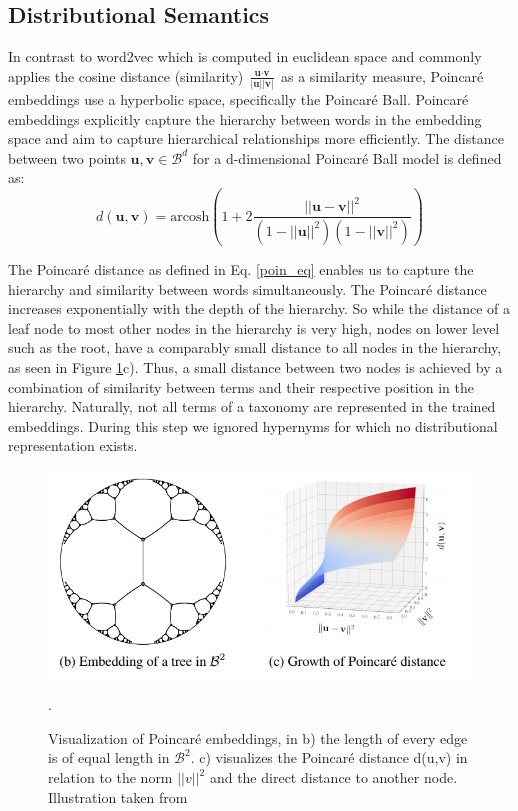 \documentclass[12pt, headsepline, a4paper]{scrartcl}
\begin{document}
\subsection{Distributional Semantics}
\label{dist_semantics}

In contrast to word2vec which is computed  in euclidean space and commonly applies the cosine distance (similarity)
$\frac{\textbf{u} \cdot \textbf{v}}{|\textbf{u}| |\textbf{v}|}$ as a similarity measure,
Poincaré embeddings use a hyperbolic space, specifically the Poincaré Ball. Poincaré embeddings explicitly capture the hierarchy between words in the embedding space and aim to capture hierarchical relationships more efficiently. The distance between two points $\textbf{u},\textbf{v} \in \mathcal{B}^d$ for a d-dimensional Poincaré Ball model is defined as:
\begin{equation}
\label{poin_eq}
    d(\textbf{u}, \textbf{v}) = \textrm{arcosh}(1 + 2 \frac{||\textbf{u} - \textbf{v} ||^2}{(1 - ||\textbf{u}||^2) (1 - ||\textbf{v}||^2)})
\end{equation}

The Poincaré distance as defined in Eq. \ref{poin_eq} enables us to capture the hierarchy and similarity between words simultaneously. The Poincaré distance increases exponentially with the depth of the hierarchy. So while the distance of a leaf node to most other nodes in the hierarchy is very high, nodes on lower level such as the root, have a comparably small distance to all nodes in the hierarchy, as seen in Figure \ref{poincare_properties}c). Thus, a small distance between two nodes is achieved by a combination of similarity between terms and their respective position in the hierarchy.
Naturally, not all terms of a taxonomy are represented in the trained embeddings. During this step we ignored hypernyms for which no distributional representation exists.

\begin{figure}[tp]
	\includegraphics[width=1\textwidth]{images/poincare_properties.png}
	\caption{Visualization of Poincaré embeddings, in b) the length of every edge is of equal length in $\mathcal{B}^2$. c) visualizes the Poincaré distance d(u,v) in relation to the norm $||v||^2$ and the direct distance to another node. Illustration taken from \cite{NIPS2017_7213}}.
	\label{poincare_properties}
\end{figure}
\end{document}
